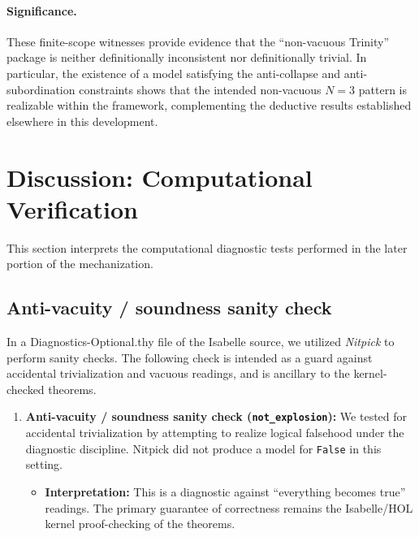 \documentclass[a4paper, 11pt]{article}
\theoremstyle{plain}
\theoremstyle{definition}
\begin{document}
\paragraph{Significance.}
These finite-scope witnesses provide evidence that the ``non-vacuous Trinity'' package is neither definitionally inconsistent nor definitionally trivial. In particular, the existence of a model satisfying the anti-collapse and anti-subordination constraints shows that the intended non-vacuous $N=3$ pattern is realizable within the framework, complementing the deductive results established elsewhere in this development.

\newpage


\section{Discussion: Computational Verification}
\label{sec:discussion}

This section interprets the computational diagnostic tests performed in the later portion of the mechanization.

\subsection{Anti-vacuity / soundness sanity check}
\label{subsec:antivacuity}

In a Diagnostics-Optional.thy file of the Isabelle source, we utilized \textit{Nitpick} to perform sanity checks. The following check is intended as a guard against accidental trivialization and vacuous readings, and is ancillary to the kernel-checked theorems.

\begin{enumerate}
    \item \textbf{Anti-vacuity / soundness sanity check (\texttt{not\_explosion}):}
    We tested for accidental trivialization by attempting to realize logical falsehood under the diagnostic discipline. Nitpick did not produce a model for \texttt{False} in this setting.
    \begin{itemize}
        \item \textbf{Interpretation:} This is a diagnostic against ``everything becomes true'' readings. The primary guarantee of correctness remains the Isabelle/HOL kernel proof-checking of the theorems.
    \end{itemize}
\end{enumerate}
\end{document}
